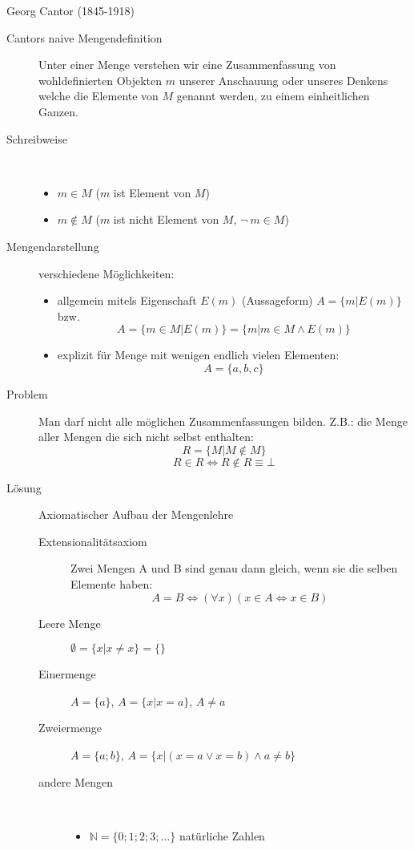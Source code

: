 Georg Cantor (1845-1918)
\begin{description}
    \item[Cantors naive Mengendefinition] Unter einer Menge verstehen wir eine Zusammenfassung von wohldefinierten Objekten $m$ unserer Anschauung oder unseres Denkens welche die Elemente von $M$ genannt werden, zu einem einheitlichen Ganzen.
    \item[Schreibweise]\
    \begin{itemize}
        \item $m \in M$ ($m$ ist Element von $M$)
        \item $m \not\in M$ ($m$ ist nicht Element von $M$, $\neg\ m \in M$)
    \end{itemize}
    \item[Mengendarstellung] verschiedene Möglichkeiten:
    \begin{itemize}
        \item allgemein mitels Eigenschaft $E(m)$ (Aussageform) $A=\lbrace m|E(m) \rbrace$ bzw.
        $$A = \lbrace m \in M | E(m) \rbrace = \lbrace m | m \in M \wedge E(m) \rbrace$$
        \item explizit für Menge mit wenigen endlich vielen Elementen:
        $$A=\lbrace a, b, c\rbrace$$
    \end{itemize}
    \item[Problem] Man darf nicht alle möglichen Zusammenfassungen bilden. Z.B.: die Menge aller Mengen die sich nicht selbst enthalten:
    $$R=\lbrace M | M \not \in M \rbrace$$
    $$R \in R \Leftrightarrow R \not \in R \equiv \bot$$
    \item[Lösung] Axiomatischer Aufbau der Mengenlehre
    \begin{description}
        \item[Extensionalitätsaxiom] Zwei Mengen A und B sind genau dann gleich, wenn sie die selben Elemente haben:
        $$A = B \Leftrightarrow (\forall x)(x \in A \Leftrightarrow x \in B)$$
        \item[Leere Menge] $\emptyset = \lbrace x | x \not = x\rbrace = \lbrace\rbrace$
        \item[Einermenge] $A=\lbrace a \rbrace$, $A = \lbrace x | x = a \rbrace$, $A \not = a$
        \item[Zweiermenge] $A=\lbrace a; b \rbrace$, $A = \lbrace x|(x=a \vee x=b) \wedge a \not = b \rbrace$
        \item[andere Mengen] \
        \begin{itemize}
            \item $\mathbb{N} = \lbrace 0;1;2;3;\dots \rbrace$ natürliche Zahlen

\end{itemize}
\end{description}
\end{description}
